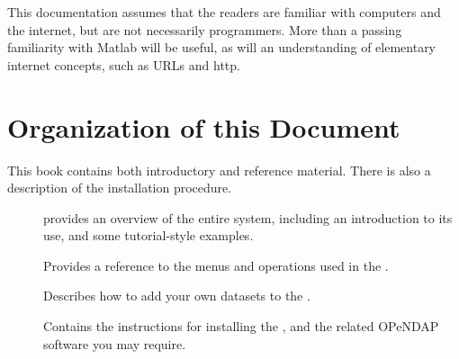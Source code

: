 This documentation assumes that the readers are familiar with
computers and the internet, but are not necessarily programmers. More
than a passing familiarity with Matlab will be useful, as will an
understanding of elementary internet concepts, such as URLs and http.

\section{Organization of this Document}

This book contains both introductory and reference material. There is
also a description of the installation procedure.

\begin{description}

\item[] provides an overview 
of the entire system, including an introduction to its use, and some
tutorial-style examples.

\item[] Provides a reference to the menus
and operations used in the \GUI.

\item[] Describes how to add your own
datasets to the \GUI.

\item[] Contains the instructions 
for installing the \GUI, and the related OPeNDAP software you may
require.



\end{description}


\listconventions


%
%
%
%
%
%
%
%
